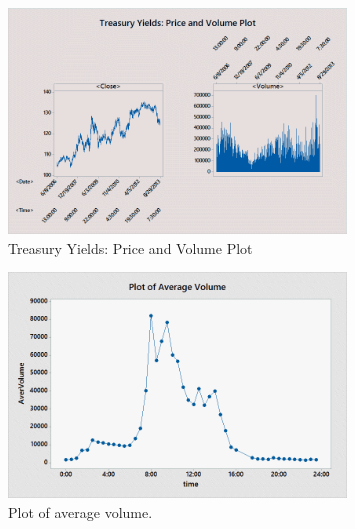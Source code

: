         \begin{figure}[!ht]
        \centering
        \includegraphics[width=0.8\textwidth]{chapters/chapter_stat_ts/figures/treasury.png}
        \caption{Treasury Yields: Price and Volume Plot \label{fig:treasuryyields}}
        \end{figure}
        \begin{figure}[!ht]
        \centering
        \includegraphics[width=0.8\textwidth]{chapters/chapter_stat_ts/figures/avgvol.png}
        \caption{Plot of average volume. \label{fig:averagevolume}}
        \end{figure}

